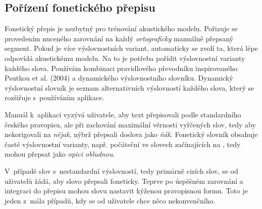 \subsection{Pořízení fonetického přepisu}
\label{ssec:porizeni-fonetickeho-prepisu}

Fonetický přepis je nezbytný pro trénování akustického modelu. Pořizuje se
provedením nuceného zarovnání na každý {\em ortograficky} manuálně přepsaný segment. Pokud je více
výslovnostních variant, automaticky se zvolí ta, která lépe odpovídá akustickému
modelu. Na to je potřeba pořídit výslovnostní varianty každého slova. Používám
kombinaci pravidlového převodníku inspirovaného Psutkou et
al. (2004)\cite{psutka2004development} a dynamického výslovnostního slovníku. Dynamický
výslovnostní slovník je seznam alternativních výslovností každého slova, který
se rozšiřuje s~používáním aplikace.

Manuál k~aplikaci vyzývá uživatele, aby text přepisovali podle standardního
českého pravopisu, ale při zachování maximální věrnosti vyřčených slov, tedy aby
nekorigovali
na {\em nějak}, nýbrž
přepsali doslova jako {\em ňák}. Fonetický slovník obsahuje časté výslovnostní
varianty, např. počáteční
{}
ve slovech
začínajících na
,
tedy
{}
mohou přepsat jako {\em opici obludnou}.

V~případě slov s~nestandardní výslovností, tedy primárně cizích slov, se od
uživatelů žádá, aby slovo přepsali foneticky. Teprve po úspěšném zarovnání a
integraci do přepisu mohou slovu nastavit kýženou pravopisnou formu. Toto je
jeden z~mála případů, kdy se od uživatele chce něco nekonvenčního.

